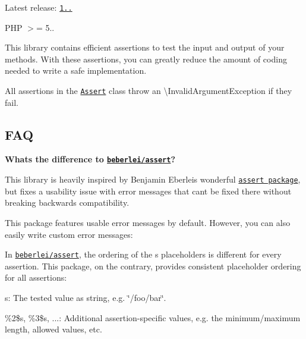 \href{https://travis-ci.org/webmozart/assert}{\tt } \href{https://ci.appveyor.com/project/webmozart/assert/branch/master}{\tt } \href{https://packagist.org/packages/webmozart/assert}{\tt } \href{https://packagist.org/packages/webmozart/assert}{\tt } \href{https://www.versioneye.com/php/webmozart:assert/1.2.0}{\tt }

Latest release\+: \href{https://packagist.org/packages/webmozart/assert#1.2.0}{\tt 1..}

P\+HP $>$= 5..

This library contains efficient assertions to test the input and output of your methods. With these assertions, you can greatly reduce the amount of coding needed to write a safe implementation.

All assertions in the \href{src/Assert.php}{\tt {\ttfamily Assert}} class throw an {\ttfamily \textbackslash{}Invalid\+Argument\+Exception} if they fail.

\subsection*{F\+AQ }

{\bfseries What\textquotesingle{}s the difference to \href{https://github.com/beberlei/assert}{\tt beberlei/assert}?}

This library is heavily inspired by Benjamin Eberlei\textquotesingle{}s wonderful \href{https://github.com/beberlei/assert}{\tt assert package}, but fixes a usability issue with error messages that can\textquotesingle{}t be fixed there without breaking backwards compatibility.

This package features usable error messages by default. However, you can also easily write custom error messages\+:




In \href{https://github.com/beberlei/assert}{\tt beberlei/assert}, the ordering of the {\ttfamily s} placeholders is different for every assertion. This package, on the contrary, provides consistent placeholder ordering for all assertions\+:


\begin{DoxyItemize}
\item {\ttfamily s}\+: The tested value as string, e.\+g. {\ttfamily \char`\"{}/foo/bar\char`\"{}}.
\item {\ttfamily \%2\$s}, {\ttfamily \%3\$s}, ...\+: Additional assertion-\/specific values, e.\+g. the minimum/maximum length, allowed values, etc.
\end{DoxyItemize}

